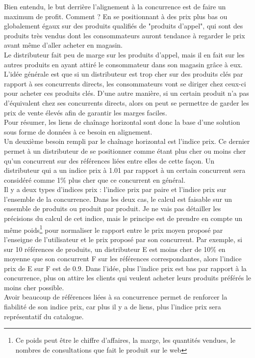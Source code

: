 \documentclass{rapportCS}
\begin{document}
Bien entendu, le but derrière l'alignement à la concurrence est de faire un
maximum de profit. Comment ? En se positionnant à des prix plus bas ou globalement égaux sur des produits
qualifiés de "produits d'appel", qui sont des produits très vendus dont les consommateurs auront tendance
à regarder le prix avant même d'aller acheter en magasin.\\
Le distributeur fait peu de marge sur les produits d'appel, mais il en fait sur les autres produits en
ayant attiré le consommateur dans son magasin grâce à eux.\\

L'idée générale est que si un distributeur est trop cher sur des produits clés par rapport à ses concurrents directs,
les consommateurs vont se diriger chez ceux-ci pour acheter ces produits clés. 
D'une autre manière, si un certain produit n'a pas d'équivalent chez ses concurrents directs,
alors on peut se permettre de garder les prix de vente élevés afin de garantir les marges faciles. \\
Pour résumer, les liens de chaînage horizontal sont donc la base d'une solution sous forme de données 
à ce besoin en alignement.\\

Un deuxième besoin rempli par le chaînage horizontal est l'indice prix. Ce dernier permet à un distributeur
de se positionner comme étant plus cher ou moins cher qu'un concurrent sur des références liées entre elles
de cette façon. Un distributeur qui a un indice prix à 1.01 par rapport à un certain concurrent sera considéré
comme 1\% plus cher que ce concurrent en général. \\
Il y a deux types d'indices prix : l'indice prix par paire et l'indice prix sur l'ensemble de la concurrence.
Dans les deux cas, le calcul est faisable sur un ensemble de produits ou produit par produit.
Je ne vais pas détailler les précisions du calcul de cet indice, mais le principe est de prendre en compte
un même poids\footnote[3]{Ce poids peut être le chiffre d'affaires, la marge, les quantités vendues, le nombres de consultations
que fait le produit sur le web } pour normaliser le rapport entre le prix moyen proposé par
l'enseigne de l'utilisateur et le prix proposé par son concurrent.
Par exemple, si sur 10 références de produits, un distributeur E est moins cher de 10\%
en moyenne que son concurrent F sur les références correspondantes, alors l'indice prix de E sur F est
de 0.9. Dans l'idée, plus l'indice prix est bas par rapport à la concurrence, plus on attire les clients
qui veulent acheter leurs produits préférés le moins cher possible.\\
Avoir beaucoup de références liées à sa concurrence permet de renforcer la fiabilité de son indice prix,
car plus il y a de liens, plus l'indice prix sera représentatif du catalogue.
\end{document}
